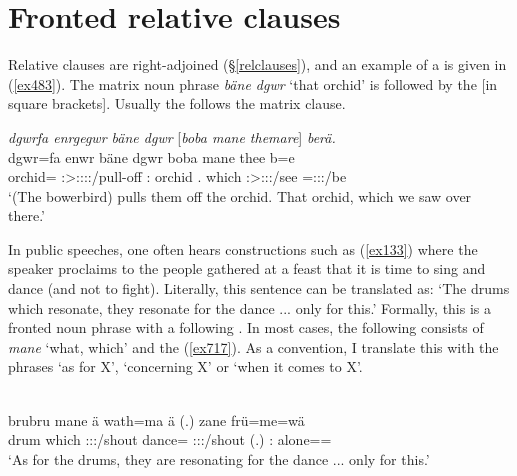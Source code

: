 \section{Fronted relative clauses} \label{info-cleft}

Relative clauses are right-adjoined ({\S}\ref{relclauses}), and an example of a  is given in (\ref{ex483}). The matrix noun phrase \emph{bäne dgwr} `that orchid' is followed by the  [in square brackets]. Usually the  follows the matrix clause.

\begin{exe}
	\ex \emph{dgwrfa enrgegwr bäne dgwr} [\emph{boba mane themare}] \emph{berä.}\\
	\gll dgwr=fa enwr bäne dgwr boba mane thee b=e\\
	orchid={\Abl} \Stsg:\Sbj>\Stpl:\Obj:\Nonpast:\Ipfv:\Venit/pull-off \Dem:\Med{} orchid \Med.{\Abl} which  \Fpl:\Sbj>\Stpl:\Obj:\Rpst:\Pfv/see \Med=\Stpl:\Sbj:\Nonpast:\Ipfv/be\\
	\trans `(The bowerbird) pulls them off the orchid. That orchid, which we saw over there.'\\
	\label{ex483}
\end{exe}

In public speeches, one often hears  constructions such as (\ref{ex133}) where the speaker proclaims to the people gathered at a feast that it is time to sing and dance (and not to fight). Literally, this sentence can be translated as: `The drums which resonate, they resonate for the dance ... only for this.' Formally, this is a fronted noun phrase with a following . In most cases, the following  consists of \emph{mane} `what, which' and the  (\ref{ex717}). As a convention, I translate this with the  phrases `as for X', `concerning X' or `when it comes to X'.

\begin{exe}
	\\
	\gll brubru mane ä wath=ma ä (.) zane frü=me=wä\\
	drum which \Stpl:\Sbj:\Nonpast:\Ipfv/shout dance={\Char} \Stpl:\Sbj:\Nonpast:\Ipfv/shout (.) \Dem:{\Prox} alone=\Ins=\Emph\\
	\trans `As for the drums, they are resonating for the dance ... only for this.'\\
	\label{ex133}
\end{exe}

